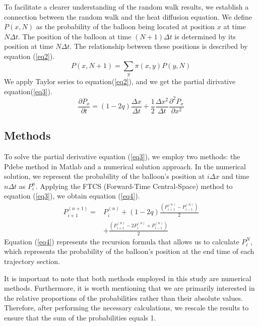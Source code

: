 \documentclass{article}
\begin{document}
\begin{multicols}{2}
\indent\setlength{\parindent}{2em}To facilitate a clearer understanding of the random walk results, we establish a connection between the random walk and the heat diffusion equation. We define $P(x,N)$ as the probability of the balloon being located at position $x$ at time $N\Delta t$. The position of the balloon at time $(N+1)\Delta t$ is determined by its position at time $N\Delta t$. The relationship between these positions is described by equation (\ref{eq2}).
\begin{equation}
P(x,N+1)=\sum_y \pi(x,y)P(y,N)
\label{eq2}
\end{equation}
\indent\setlength{\parindent}{2em}We apply Taylor series to equation(\ref{eq2}), and we get the partial dirivative equation(\ref{eq3}). 
\begin{equation}
\frac{\partial P_x}{\partial t}=(1-2q)\frac{\Delta x}{\Delta t}+\frac{1}{2}\frac{\Delta x^2}{\Delta t}\frac{{\partial}^2 P_x}{\partial x^2}
\label{eq3}
\end{equation}
\subsection{Methods}
To solve the partial derivative equation (\ref{eq3}), we employ two methods: the Pdebe method in Matlab and a numerical solution approach. In the numerical solution, we represent the probability of the balloon's position at $i\Delta x$ and time $n\Delta t$ as $P_{i}^{n}$. Applying the FTCS (Forward-Time Central-Space) method to equation (\ref{eq3}), we obtain equation (\ref{eq4}).
\begin{equation}
\begin{split}
P^{(n+1)}_{i+1}=&P^{(n)}_i+(1-2q)\frac{(P^{(n)}_{i+1}-P^{(n)}_{i-1})}{2}\\
&+\frac{(P^{(n)}_{i+1}-2P^{(n)}_{i}+P^{(n)}_{i-1})}{2}
\label{eq4}
\end{split}
\end{equation}
\indent\setlength{\parindent}{2em}Equation (\ref{eq4}) represents the recursion formula that allows us to calculate $P_{i}^{N}$, which represents the probability of the balloon's position at the end time of each trajectory section.

It is important to note that both methods employed in this study are numerical methods. Furthermore, it is worth mentioning that we are primarily interested in the relative proportions of the probabilities rather than their absolute values. Therefore, after performing the necessary calculations, we rescale the results to ensure that the sum of the probabilities equals 1.


\end{multicols}
\end{document}
